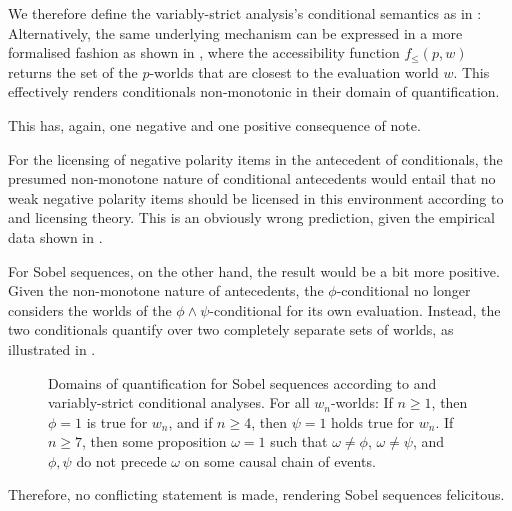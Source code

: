 \noindent We therefore define the variably-strict analysis's conditional semantics as in :
\ex{}\xe
Alternatively, the same underlying mechanism can be expressed in a more formalised fashion as shown in , where the accessibility function $f_\leqslant(p,w)$ returns the set of the $p$-worlds that are closest to the evaluation world $w$.\enlargethispage*{1.5\baselineskip}
\ex{}\xe\newpage
\noindent This effectively renders conditionals non-monotonic in their domain of quantification. 
\ex\label{def:nm-intro}%

\xe
This has, again, one negative and one positive consequence of note.

For the licensing of negative polarity items in the antecedent of conditionals, the presumed non-monotone nature of conditional antecedents would entail that no weak negative polarity items should be licensed in this environment according to \textcite{Fauconnier1975a,Fauconnier1975b} and  licensing theory. This is an obviously wrong prediction, given the empirical data shown in .

For Sobel sequences, on the other hand, the result would be a bit more positive. Given the non-monotone nature of antecedents, the $\phi$-conditional no longer considers the worlds of the $\phi\land\psi$-conditional for its own evaluation. Instead, the two conditionals quantify over two completely separate sets of worlds, as illustrated in .
\begin{figure}[!htb]

\caption{Domains of quantification for Sobel sequences according to \textcite{Stalnaker1968} and  variably-strict conditional analyses. For all $w_n$-worlds: If $n\geqslant1$, then $\phi=1$ is true for $w_n$, and if $n\geqslant 4$, then $\psi=1$ holds true for $w_n$. If $n\geqslant 7$, then some proposition $\omega=1$ such that $\omega\neq\phi$, $\omega\neq\psi$, and $\phi,\psi$ do not precede $\omega$ on some causal chain of events.}
\end{figure}

\noindent Therefore, no conflicting statement is made, rendering Sobel sequences felicitous.

